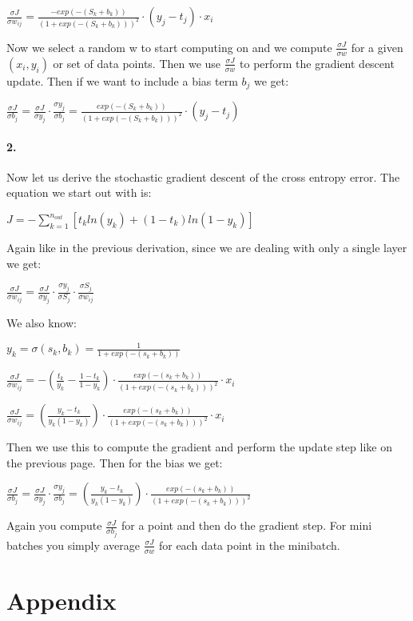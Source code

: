 \documentclass[12pt]{article}
\begin{document}
$\frac{\sigma J}{\sigma w_{ij}} = 
\frac{-exp(-(S_k + b_k))}{(1 + exp(-(S_k + b_k)))^2}
\cdot (y_j - t_j) \cdot x_i$

Now we select a random w to start computing on and we compute $\frac{\sigma J}{\sigma w}$ for a given $(x_i, y_i)$ or set of data points. Then we use $\frac{\sigma J}{\sigma w}$ to perform the gradient descent update. Then if we want to include a bias term $b_j$ we get:

$\frac{\sigma J}{\sigma b_j} =
\frac{\sigma J}{\sigma y_j} \cdot \frac{\sigma y_j}{\sigma b_j}
= \frac{exp(-(S_k + b_k))}{(1 + exp(-(S_k + b_k)))^2}
\cdot (y_j - t_j)
$

\paragraph{2.}

Now let us derive the stochastic gradient descent of the cross entropy error. The equation we start out with is:

$J = - \sum\limits_{k=1}^{n_{out}} [t_k ln(y_k) + (1 - t_k)ln(1-y_k)]$

Again like in the previous derivation, since we are dealing with only a single layer we get:

$\frac{\sigma J}{\sigma w_{ij}} = 
\frac{\sigma J}{\sigma y_j} \cdot \frac{\sigma y_j}{\sigma S_j} \cdot \frac{\sigma S_j}{\sigma w_{ij}}$

We also know:

$y_k = \sigma(s_k,b_k) = \frac{1}{1 + exp(-(s_k + b_k))}$

$\frac{\sigma J}{\sigma w_{ij}}= -(\frac{t_k}{y_k} - \frac{1 - t_k}{1 - y_k}) \cdot
\frac{exp(-(s_k + b_k))}{(1 + exp(-(s_k + b_k)))^2}
\cdot x_i $

$\frac{\sigma J}{\sigma w_{ij}}= (\frac{y_k - t_k}{y_k(1 - y_k)}) \cdot
\frac{exp(-(s_k + b_k))}{(1 + exp(-(s_k + b_k)))^2}
\cdot x_i $

Then we use this to compute the gradient and perform the update step like on the previous page. Then for the bias we get:

$\frac{\sigma J}{\sigma b_j}=
\frac{\sigma J}{\sigma y_j} \cdot \frac{\sigma y_j}{\sigma b_j}
= (\frac{y_k - t_k}{y_k(1 - y_k)}) \cdot
\frac{exp(-(s_k + b_k))}{(1 + exp(-(s_k + b_k)))^2}
$

Again you compute $\frac{\sigma J}{\sigma b_j}$ for a point and then do the gradient step. For mini batches you simply average $\frac{\sigma J}{\sigma w}$ for each data point in the minibatch.


\newpage
\section*{Appendix}
\end{document}
